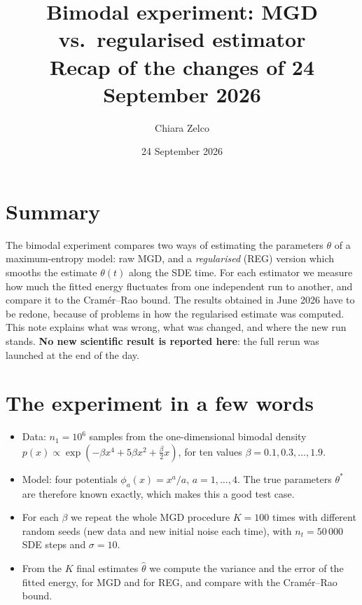 \documentclass[11pt,a4paper]{article}
\title{Bimodal experiment: MGD vs.\ regularised estimator\\[2pt]\large Recap of the changes of 24 September 2026}
\author{Chiara Zelco}
\date{24 September 2026}
\begin{document}
\maketitle

\section*{Summary}
The bimodal experiment compares two ways of estimating the parameters $\theta$ of a
maximum-entropy model: raw MGD, and a \emph{regularised} (REG) version which smooths the
estimate $\theta(t)$ along the SDE time. For each estimator we measure how much the fitted
energy fluctuates from one independent run to another, and compare it to the
Cram\'er--Rao bound. The results obtained in June 2026 have to be redone, because of
problems in how the regularised estimate was computed. This note explains what was wrong,
what was changed, and where the new run stands. \textbf{No new scientific result is
reported here}: the full rerun was launched at the end of the day.

\section{The experiment in a few words}
\begin{itemize}
  \item Data: $n_1 = 10^6$ samples from the one-dimensional bimodal density
        $p(x) \propto \exp(-\beta x^4 + 5\beta x^2 + \tfrac{\beta}{2} x)$,
        for ten values $\beta = 0.1, 0.3, \dots, 1.9$.
  \item Model: four potentials $\phi_a(x) = x^a/a$, $a = 1,\dots,4$. The true parameters
        $\theta^*$ are therefore known exactly, which makes this a good test case.
  \item For each $\beta$ we repeat the whole MGD procedure $K = 100$ times with different
        random seeds (new data and new initial noise each time), with $n_t = 50\,000$ SDE steps and $\sigma = 10$.
  \item From the $K$ final estimates $\hat\theta$ we compute the variance and the error of
        the fitted energy, for MGD and for REG, and compare with the Cram\'er--Rao bound.
\end{itemize}
\end{document}
